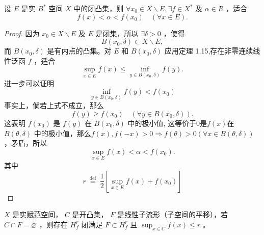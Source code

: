 \documentclass[lang=cn,newtx,10pt,scheme=chinese,thmcnt=chapter]{elegantbook}
\begin{document}
\begin{corollary}[Ascoli 定理] 设 $E$ 是实 $B^*$ 空间 $X$ 中的闭凸集，则 $\forall x_0 \in X \backslash E, \exists f \in X ^*$ 及 $\alpha \in R$ ，适合
\begin{equation*}
f(x)<\alpha<f\left(x_0\right) \quad(\forall x \in E) .
\end{equation*}
\end{corollary}
\begin{proof}
因为 $x_0 \in X \backslash E$ 及 $E$ 是闭集，所以 $\exists \delta>0$ ，使得
\begin{equation*}
B\left(x_0, \delta\right) \subset X \backslash E,
\end{equation*}
而 $B\left(x_0, \delta\right)$ 是有内点的凸集。对 $E$ 和 $B\left(x_0, \delta\right)$ 应用定理 1.15,存在非零连续线性泛函 $f$ ，适合
\begin{equation*}
\sup _{x \in E} f(x) \leqslant \inf _{y \in B\left(x_0, \delta\right)} f(y) .
\end{equation*}
进一步可以证明
\begin{equation*}
\inf _{y \in B\left(x_0, \delta\right)} f(y)<f\left(x_0\right)
\end{equation*}
事实上，倘若上式不成立，那么
\begin{equation*}
f(y) \geqslant f\left(x_0\right) \quad\left(\forall y \in B\left(x_0, \delta\right)\right) .
\end{equation*}
这表明 $f\left(x_0\right)$ 是 $f(y)$ 在 $B\left(x_0, \delta\right)$ 中的极小值, 这等价于$0$是$f(x)$在$B\left(\theta, \delta\right)$ 中的极小值，那么$f(x),f(-x)>0\Rightarrow f(\theta)>0(\forall x\in B\left(\theta, \delta\right))$，矛盾，所以
\begin{equation*}
\sup _{x \in E} f(x) <\alpha< f(x_0).
\end{equation*}
其中\begin{equation*}
r \stackrel{\text { def }}{=} \frac{1}{2}\left[\sup _{x \in E} f(x)+f(x_0)\right]
\end{equation*}

\end{proof}
\begin{corollary}[Mazur 定理]
$X$ 是实赋范空间， $C$ 是开凸集， $F$ 是线性子流形（子空间的平移），若 $C \cap F=\varnothing$ ，则存在 $H_f^r$ 闭满足 $F \subset H_f^r$ 且 $\sup _{x \in C} f(x) \leqslant r$ 。


\end{corollary}
\end{document}
